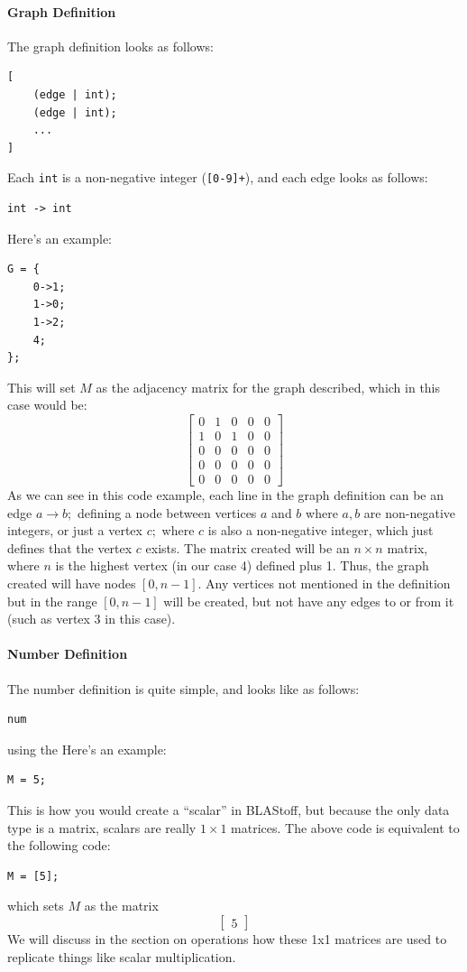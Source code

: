 \paragraph{Graph Definition}
The graph definition looks as follows:
\begin{lstlisting}
[
    (edge | int);
    (edge | int);
    ...
]
\end{lstlisting}
Each \verb=int= is a non-negative integer (\verb=[0-9]+=), and each edge looks as follows:
\begin{lstlisting}
int -> int
\end{lstlisting}
Here's an example:
\begin{lstlisting}
G = {
    0->1;
    1->0;
    1->2;
    4;
};
\end{lstlisting}
This will set $M$ as the adjacency matrix for the graph described, which in this case would be: $$\begin{bmatrix}0&1&0&0&0\\1&0&1&0&0\\0&0&0&0&0\\0&0&0&0&0\\0&0&0&0&0\end{bmatrix}$$  As we can see in this code example, each line in the graph definition can be an edge $a\to b;$ defining a node between vertices $a$ and $b$ where $a,b$ are non-negative integers, or just a vertex $c;$ where $c$ is also a non-negative integer, which just defines that the vertex $c$ exists.  The matrix created will be an $n \times n$ matrix, where $n$ is the highest vertex (in our case 4) defined plus 1.  Thus, the graph created will have nodes $[0,n-1]$.  Any vertices not mentioned in the definition but in the range $[0,n-1]$ will be created, but not have any edges to or from it (such as vertex 3 in this case). 

\paragraph{Number Definition}
The number definition is quite simple, and looks like as follows:
\begin{lstlisting}
num
\end{lstlisting}
using the
Here's an example:
\begin{lstlisting}
M = 5;
\end{lstlisting}
This is how you would create a  ``scalar'' in BLAStoff, but because the only data type is a matrix, scalars are really $1\times 1$ matrices.  The above code is equivalent to the following code:
\begin{lstlisting}
M = [5];
\end{lstlisting}
which sets $M$ as the matrix $$\begin{bmatrix}5\end{bmatrix}$$
We will discuss in the section on operations how these 1x1 matrices are used to replicate things like scalar multiplication.

